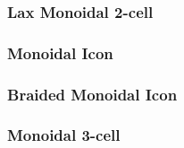 %

%


\subsubsection*{Lax Monoidal 2-cell}

  \newpage

 \newpage

 \newpage





%
%

\newpage
\subsubsection*{Monoidal Icon}

\newpage

\newpage

\newpage

\subsubsection*{Braided Monoidal Icon}



\subsubsection*{Monoidal 3-cell}

